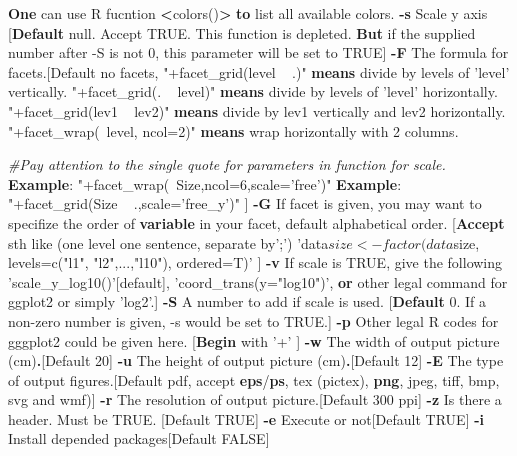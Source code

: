 \documentclass[]{article}
\newenvironment{Shaded}{\begin{snugshade}}{\end{snugshade}}
\newcommand{\KeywordTok}[1]{\textcolor[rgb]{0.13,0.29,0.53}{\textbf{{#1}}}}
\newcommand{\StringTok}[1]{\textcolor[rgb]{0.31,0.60,0.02}{{#1}}}
\newcommand{\CommentTok}[1]{\textcolor[rgb]{0.56,0.35,0.01}{\textit{{#1}}}}
\newcommand{\NormalTok}[1]{{#1}}
\numberwithin{figure}{section}
\numberwithin{table}{section}
\theoremstyle{definition}
\theoremstyle{definition}
\theoremstyle{definition}
\theoremstyle{remark}
\begin{document}
\begin{Shaded}
\begin{Highlighting}[]
        \KeywordTok{One} \NormalTok{can use R fucntion }\KeywordTok{<}\NormalTok{colors()}\KeywordTok{>} \KeywordTok{to} \NormalTok{list all available colors.}
    \KeywordTok{-s}  \NormalTok{Scale y axis}
        \NormalTok{[}\KeywordTok{Default} \NormalTok{null. Accept TRUE. This function is depleted. }
        \KeywordTok{But} \NormalTok{if the supplied number after -S is not 0, this parameter will be set to TRUE]}
    \KeywordTok{-F}  \NormalTok{The formula for facets.[Default no facets, }
        \StringTok{"+facet_grid(level ~ .)"} \KeywordTok{means} \NormalTok{divide by levels of }\StringTok{'level'} \NormalTok{vertically.}
        \StringTok{"+facet_grid(. ~ level)"} \KeywordTok{means} \NormalTok{divide by levels of }\StringTok{'level'} \NormalTok{horizontally.}
        \StringTok{"+facet_grid(lev1 ~ lev2)"} \KeywordTok{means} \NormalTok{divide by lev1 vertically and lev2 horizontally.}
        \StringTok{"+facet_wrap(~level, ncol=2)"} \KeywordTok{means} \NormalTok{wrap horizontally with 2 columns.}

        \CommentTok{#Pay attention to the single quote for parameters in function for scale.}
        \KeywordTok{Example}\NormalTok{: }\StringTok{"+facet_wrap(~Size,ncol=6,scale='free')"}
        \KeywordTok{Example}\NormalTok{: }\StringTok{"+facet_grid(Size ~ .,scale='free_y')"}
        \NormalTok{]}
    \KeywordTok{-G}  \NormalTok{If facet is given, you may want to specifize the order of}
        \KeywordTok{variable} \NormalTok{in your facet, default alphabetical order.}
        \NormalTok{[}\KeywordTok{Accept} \NormalTok{sth like (one level one sentence, separate by}\StringTok{';'}\NormalTok{) }
        \StringTok{'data$size <- factor(data$size, levels=c("l1", "l2",...,"l10"), ordered=T)'} \NormalTok{]}
    \KeywordTok{-v}  \NormalTok{If scale is TRUE, give the following }\StringTok{'scale_y_log10()'}\NormalTok{[default], }\StringTok{'coord_trans(y="log10")'}\NormalTok{, }
        \KeywordTok{or} \NormalTok{other legal command for ggplot2 or simply }\StringTok{'log2'}\NormalTok{.]}
    \KeywordTok{-S}  \NormalTok{A number to add if scale is used.}
        \NormalTok{[}\KeywordTok{Default} \NormalTok{0. If a non-zero number is given, -s would be set to TRUE.]    }
    \KeywordTok{-p}  \NormalTok{Other legal R codes for gggplot2 could be given here.}
        \NormalTok{[}\KeywordTok{Begin} \NormalTok{with }\StringTok{'+'} \NormalTok{]}
    \KeywordTok{-w}  \NormalTok{The width of output picture (cm)}\KeywordTok{.}\NormalTok{[Default 20]}
    \KeywordTok{-u}  \NormalTok{The height of output picture (cm)}\KeywordTok{.}\NormalTok{[Default 12] }
    \KeywordTok{-E}  \NormalTok{The type of output figures.[Default pdf, accept}
        \KeywordTok{eps}\NormalTok{/}\KeywordTok{ps}\NormalTok{, tex (pictex), }\KeywordTok{png}\NormalTok{, jpeg, tiff, bmp, svg and wmf)]}
    \KeywordTok{-r}  \NormalTok{The resolution of output picture.[Default 300 ppi]}
    \KeywordTok{-z}  \NormalTok{Is there a header. Must be TRUE. [Default TRUE]}
    \KeywordTok{-e}  \NormalTok{Execute or not[Default TRUE]}
    \KeywordTok{-i}  \NormalTok{Install depended packages[Default FALSE]}
\end{Highlighting}
\end{Shaded}
\end{document}
